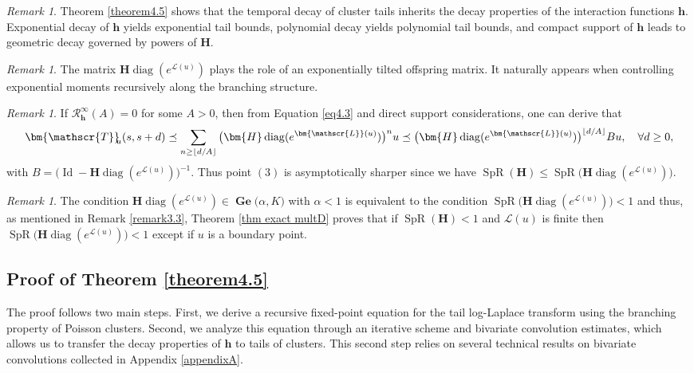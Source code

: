 \documentclass[reqno,final,11pt]{amsart}
\theoremstyle{plain}
\theoremstyle{definition}
\theoremstyle{remark}
\newtheorem{remark}[theorem]{Remark}
\newcommand{\Ge}[2]{\bm{\Gel(} #1,#2 \bm{)} }
\renewcommand{\L}{\bm{\mathscr{L}}}
\newcommand{\h}{\bm{h}}
\newcommand{\bTa}[1]{\bm{\mathscr{T}}_{\mkern-7mu #1}}
\renewcommand{\H}{\bm{H}}
\newcommand{\Res}{\mathcal{R}}
\DeclareMathOperator{\diag}{diag}
\DeclareMathOperator{\spr}{SpR}
\DeclareMathOperator{\Gel}{Ge}
\DeclareMathOperator{\Id}{Id}
\begin{document}
\begin{remark}
	Theorem \ref{theorem4.5} shows that the temporal decay of cluster tails inherits the decay properties of the interaction functions $\h$. Exponential decay of $\h$ yields exponential tail bounds, polynomial decay yields polynomial tail bounds, and compact support of $\h$ leads to geometric decay governed by powers of $\H$.
\end{remark}

\begin{remark}
	The matrix $\H\diag(e^{\L(u)})$ plays the role of an exponentially tilted offspring matrix. It naturally appears when controlling exponential moments recursively along the branching structure.
\end{remark}

\begin{remark}
	If $\Res_{\h}^{\infty}(A) = 0$ for some $A>0$, then from Equation \eqref{eq4.3} and direct support considerations, one can derive that 
	\begin{equation*}
		\bTa{u}(s,s+d) \preceq \sum_{n\geq \lfloor d/A \rfloor}\big(\H\diag(e^{\L(u)})\big)^{n} u \preceq \big(\H\diag(e^{\L(u)})\big)^{\lfloor d/A \rfloor} B u, \quad \forall d\geq 0,
	\end{equation*}
	with $B = \big(\Id-\H\diag(e^{\L(u)})\big)^{-1}$. Thus point $(3)$ is asymptotically sharper since we have $\spr(\H) \leq \spr\big(\H\diag(e^{\L(u)})\big)$.
\end{remark}

\begin{remark}
	The condition $\H \diag(e^{\L(u)}) \in \Ge{\alpha}{K}$ with $\alpha <1$ is equivalent to the condition $\spr\big( \H \diag(e^{\L(u)}) \big) <1$ and thus, as mentioned in Remark \ref{remark3.3}, Theorem \ref{thm exact multD} proves that if $\spr(\H)<1$ and $\L(u)$ is finite then $\spr\big( \H \diag(e^{\L(u)}) \big) <1$ except if $u$ is a boundary point.
\end{remark}

\subsection{Proof of Theorem \ref{theorem4.5}}\label{section4.3}

The proof follows two main steps. First, we derive a recursive fixed-point equation for the tail log-Laplace transform using the branching property of Poisson clusters. Second, we analyze this equation through an iterative scheme and bivariate convolution estimates, which allows us to transfer the decay properties of $\h$ to tails of clusters. This second step relies on several technical results on bivariate convolutions collected in Appendix \ref{appendixA}.
\end{document}
